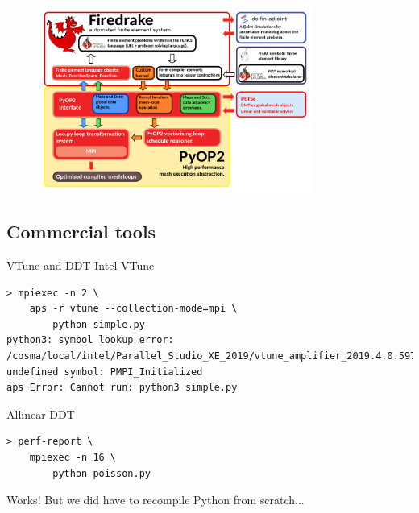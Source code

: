 \documentclass[pdf,aspectratio=169]{beamer}
\begin{document}
\begin{frame}
\begin{figure}
	\includegraphics[width=0.8\textwidth]{firedrake_diagram.pdf}
\end{figure}
\end{frame}

\subsection{Commercial tools}
\begin{frame}[fragile]{VTune and DDT}
Intel VTune
\begin{lstlisting}
> mpiexec -n 2 \
    aps -r vtune --collection-mode=mpi \
        python simple.py
python3: symbol lookup error: /cosma/local/intel/Parallel_Studio_XE_2019/vtune_amplifier_2019.4.0.597835/lib64/libmps.so: undefined symbol: PMPI_Initialized
aps Error: Cannot run: python3 simple.py
\end{lstlisting}

Allinear DDT
\begin{lstlisting}
> perf-report \
    mpiexec -n 16 \
        python poisson.py
\end{lstlisting}
Works! But we did have to recompile Python from scratch...
\end{frame}
\end{document}
